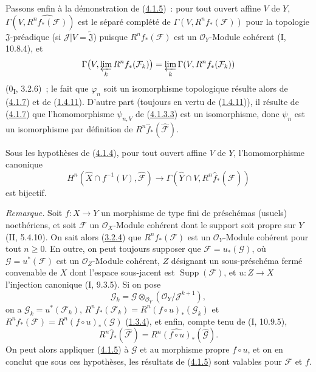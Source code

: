 \begin{env}[4.1.8]
\label{III.4.1.8-fr}
Passons enfin à la démonstration de (\hyperref[III.4.1.5-fr]{4.1.5})~:
pour tout ouvert affine $V$ de $Y$,
$\Gamma(V,\widehat{R^nf_*(\mathcal F)})$ est le séparé complété de
$\Gamma(V,R^nf_*(\mathcal F))$ pour la topologie $\mathfrak J$-préadique
(si $\mathcal J|V=\widetilde{\mathfrak J}$) puisque
$R^nf_*(\mathcal F)$ est un $\mathcal O_Y$-Module cohérent (I, 10.8.4),
et
\[
\Gamma\bigl(V,\varprojlim_kR^nf_*(\mathcal F_k)\bigr)
=\varprojlim_k\Gamma(V,R^nf_*(\mathcal F_k))
\]
(0\textsubscript{I}, 3.2.6)~; le fait que $\varphi_n$ soit un isomorphisme
topologique résulte alors de (\hyperref[III.4.1.7-fr]{4.1.7}) et de
(\hyperref[III.1.4.11-fr]{1.4.11}). D'autre part (toujours en vertu de
(\hyperref[III.1.4.11-fr]{1.4.11})), il résulte de
(\hyperref[III.4.1.7-fr]{4.1.7}) que l'homomorphisme $\psi_{n,V}$ de
(\hyperref[III.4.1.3.3-fr]{4.1.3.3}) est un isomorphisme, donc $\psi_n$
est un isomorphisme par définition de
$R^n\widehat f_*(\widehat{\mathcal F})$.
\end{env}

\begin{corollary}[4.1.9]
\label{III.4.1.9-fr}
Sous les hypothèses de (\hyperref[III.4.1.4-fr]{4.1.4}), pour tout ouvert
affine $V$ de $Y$, l'homomorphisme canonique
\[
H^n(\widehat X\cap f^{-1}(V),\widehat{\mathcal F})
\longrightarrow\Gamma(\widehat Y\cap V,
R^n\widehat f_*(\widehat{\mathcal F}))
\]
est bijectif.
\end{corollary}

\begin{env}[4.1.10]
\label{III.4.1.10-fr}
\emph{Remarque.}
Soit $f:X\to Y$ un morphisme de type fini de préschémas (usuels)
noethériens, et soit $\mathcal F$ un $\mathcal O_X$-Module cohérent dont le
support soit propre sur $Y$ (II, 5.4.10). On sait alors
(\hyperref[III.3.2.4-fr]{3.2.4}) que $R^nf_*(\mathcal F)$ est un
$\mathcal O_Y$-Module cohérent pour tout $n\geq0$. En outre, on peut
toujours supposer que $\mathcal F=u_*(\mathcal G)$, où
$\mathcal G=u^*(\mathcal F)$ est un $\mathcal O_Z$-Module cohérent, $Z$
désignant un sous-préschéma fermé convenable de $X$ dont l'espace
sous-jacent est $\operatorname{Supp}(\mathcal F)$, et $u:Z\to X$
l'injection canonique (I, 9.3.5). Si on pose
\[
\mathcal G_k=\mathcal G\otimes_{\mathcal O_Y}
(\mathcal O_Y/\mathcal J^{k+1}),
\]
on a $\mathcal G_k=u^*(\mathcal F_k)$,
$R^nf_*(\mathcal F_k)=R^n(f\circ u)_*(\mathcal G_k)$ et
$R^nf_*(\mathcal F)=R^n(f\circ u)_*(\mathcal G)$
(\hyperref[III.1.3.4-fr]{1.3.4}), et enfin, compte tenu de (I, 10.9.5),
\[
R^n\widehat f_*(\widehat{\mathcal F})
=R^n\widehat{(f\circ u)}_*(\widehat{\mathcal G}).
\]
On peut alors appliquer (\hyperref[III.4.1.5-fr]{4.1.5}) à $\mathcal G$ et
au morphisme propre $f\circ u$, et on en conclut que sous ces hypothèses,
les résultats de (\hyperref[III.4.1.5-fr]{4.1.5}) sont valables pour
$\mathcal F$ et $f$.
\end{env}


